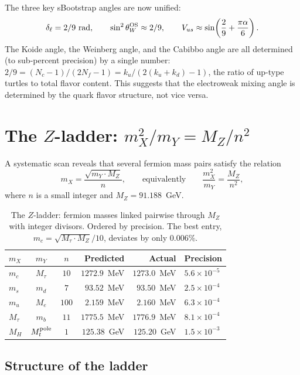 \documentclass[11pt]{article}
\begin{document}
The three key sBootstrap angles are now unified:
\begin{equation}
  \delta_\ell = 2/9~\text{rad},\qquad
  \sin^2\theta_W^{\rm OS} \approx 2/9,\qquad
  V_{us} \approx \sin\!\left(\frac{2}{9}+\frac{\pi\alpha}{6}\right).
\end{equation}
The Koide angle, the Weinberg angle, and the Cabibbo angle
are all determined (to sub-percent precision) by a single
number: $2/9 = (N_c-1)/(2N_f-1) = k_u/(2(k_u+k_d)-1)$,
the ratio of up-type turtles to total flavor content.
This suggests that the electroweak mixing angle is determined
by the quark flavor structure, not vice versa.

\section{The $Z$-ladder: $m_X^2/m_Y = M_Z/n^2$}

A systematic scan reveals that several fermion mass pairs
satisfy the relation
\begin{equation}
  m_X = \frac{\sqrt{m_Y \cdot M_Z}}{n},
  \qquad\text{equivalently}\qquad
  \frac{m_X^2}{m_Y} = \frac{M_Z}{n^2},
  \label{eq:z-ladder}
\end{equation}
where $n$ is a small integer and $M_Z = 91.188$~GeV.

\begin{table}[h]
\centering\small
\begin{tabular}{@{}l c c r r l@{}}
\toprule
$m_X$ & $m_Y$ & $n$ & Predicted & Actual & Precision \\
\midrule
$m_c$ & $M_\tau$ & $10$ & $1272.9$~MeV & $1273.0$~MeV
  & $5.6\times 10^{-5}$ \\
$m_s$ & $m_d$ & $7$ & $93.52$~MeV & $93.50$~MeV
  & $2.5\times 10^{-4}$ \\
$m_u$ & $M_e$ & $100$ & $2.159$~MeV & $2.160$~MeV
  & $6.3\times 10^{-4}$ \\
$M_\tau$ & $m_b$ & $11$ & $1775.5$~MeV & $1776.9$~MeV
  & $8.1\times 10^{-4}$ \\
$M_H$ & $M_t^{\rm pole}$ & $1$ & $125.38$~GeV & $125.20$~GeV
  & $1.5\times 10^{-3}$ \\
\bottomrule
\end{tabular}
\caption{The $Z$-ladder: fermion masses linked pairwise through
$M_Z$ with integer divisors.  Ordered by precision.
The best entry, $m_c = \sqrt{M_\tau\cdot M_Z}/10$,
deviates by only $0.006\%$.}
\label{tab:z-ladder}
\end{table}

\subsection{Structure of the ladder}
\end{document}
